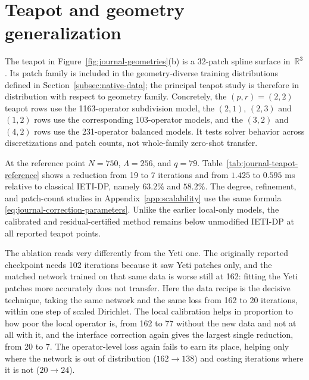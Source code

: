 \documentclass{article}
\newcommand{\R}{\mathbb{R}}
\theoremstyle{plain}
\numberwithin{equation}{section}
\begin{document}
\FloatBarrier

\section{Teapot and geometry generalization}
\label{sec:teapot-results}

The teapot in Figure~\ref{fig:journal-geometries}(b) is a 32-patch spline
surface in~$\R^3$.  Its patch family is included in the geometry-diverse
training distributions defined in Section~\ref{subsec:native-data}; the
principal teapot study is therefore in distribution with respect to geometry
family.  Concretely, the $(p,r)=(2,2)$ teapot rows use the 1163-operator
subdivision model, the $(2,1)$, $(2,3)$ and $(1,2)$ rows use the corresponding
103-operator models, and the $(3,2)$ and $(4,2)$ rows use the 231-operator
balanced models.  It tests solver behavior across discretizations and patch counts, not
whole-family zero-shot transfer.

\begin{table}[p]
    \centering
    \small
    \caption{Teapot reference problem at $(p,r)=(2,2)$, with the technique
        ablation.  Columns, techniques and protocol are those of
        Table~\ref{tab:journal-yeti-reference}; here $D$ replaces the
        Yeti-only original data by the geometry-diverse and subdivision
        families, so the two tables share their $L0D0$ network and differ in
        the $D1$ ones.  Unlike the Yeti case, all 79 requested Ritz modes are
        certified for every row, scaled Dirichlet included, so the classical
        corrected row is a genuine competitor here.}
    \label{tab:journal-teapot-reference}
    
\end{table}

At the reference point $N=750$, $\Lambda=256$, and $q=79$.
Table~\ref{tab:journal-teapot-reference} shows a reduction from 19 to 7
iterations and from $1.425$ to $0.595$ ms relative to classical IETI-DP,
namely $63.2\%$ and $58.2\%$.  The degree, refinement, and patch-count studies
in Appendix~\ref{app:scalability} use the same formula
\eqref{eq:journal-correction-parameters}.  Unlike the earlier local-only
models, the calibrated and residual-certified method remains below unmodified
IETI-DP at all reported teapot points.

The ablation reads very differently from the Yeti one.  The originally
reported checkpoint needs 102 iterations because it saw Yeti patches only, and
the matched network trained on that same data is worse still at 162: fitting
the Yeti patches more accurately does not transfer.  Here the data recipe is
the decisive technique, taking the same network and the same loss from 162 to
20 iterations, within one step of scaled Dirichlet.  The local calibration
helps in proportion to how poor the local operator is, from 162 to 77 without
the new data and not at all with it, and the interface correction again gives
the largest single reduction, from 20 to 7.  The operator-level loss again
fails to earn its place, helping only where the network is out of distribution
($162\to138$) and costing iterations where it is not ($20\to24$).
\end{document}
